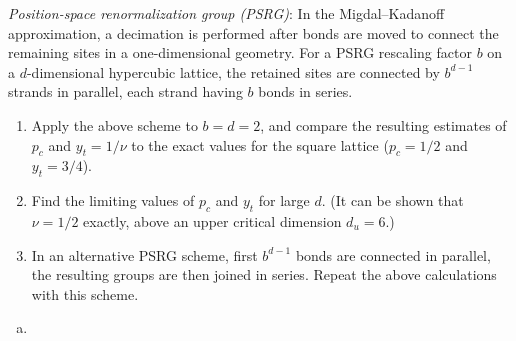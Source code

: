 \begin{problem}
    \textit{Position-space renormalization group (PSRG)}: In the Migdal--Kadanoff approximation, a decimation is performed after bonds are moved to connect the remaining sites in a one-dimensional geometry. For a PSRG rescaling factor $b$ on a $d$-dimensional hypercubic lattice, the retained sites are connected by $b^{d-1}$ strands in parallel, each strand having $b$ bonds in series.

    \begin{enumerate}
        \item[(a)] Apply the above scheme to $b = d = 2$, and compare the resulting estimates of $p_c$ and $y_t = 1/\nu$ to the exact values for the square lattice ($p_c = 1/2$ and $y_t = 3/4$).

        \item[(b)] Find the limiting values of $p_c$ and $y_t$ for large $d$. (It can be shown that $\nu = 1/2$ exactly, above an upper critical dimension $d_u = 6$.)

        \item[(c)] In an alternative PSRG scheme, first $b^{d-1}$ bonds are connected in parallel, the resulting groups are then joined in series. Repeat the above calculations with this scheme.
    \end{enumerate}
\end{problem}

\begin{solution}
    \begin{enumerate}[(a)]
        \item
    \end{enumerate}
\end{solution}
